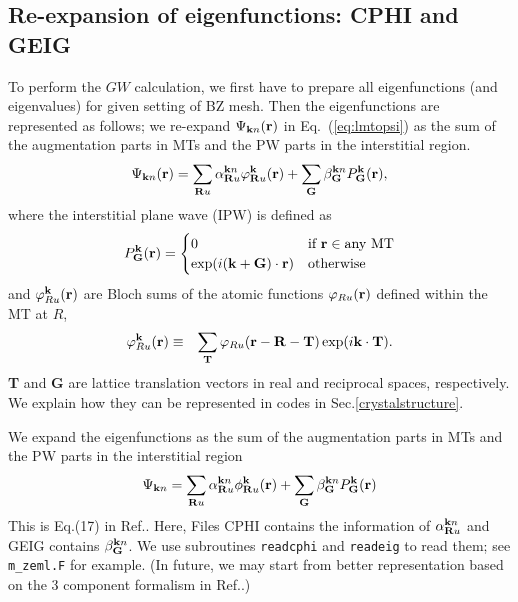 \documentclass[a4paper,10pt,epsf,fleqn]{article}
\def\Psikn{\Psi_{{\bf k}n}}
\def\Psikn{{\Psi_{{\bf k}n}}}
\newcommand{\bfk}{{\bf k}}
\newcommand{\bfr}{{\bf r}}
\newcommand{\bfR}{{\bf R}}
\newcommand{\io}[1]{{\sf  #1}}
\newcommand{\req}[1]{\mbox{Eq.~(\ref{#1})}}
\begin{document}
\subsection{Re-expansion of eigenfunctions: CPHI and GEIG}
To perform the $GW$ calculation, we first
have to prepare all eigenfunctions (and eigenvalues) for
given setting of BZ mesh. Then the eigenfunctions are
represented as follows; we
re-expand $\Psikn(\bfr)$ in \req{eq:lmtopsi}  
as the sum of the augmentation parts in MTs and the
PW parts in the interstitial region.
\begin{eqnarray}
\Psikn(\bfr)
= \sum_{\bfR u}  \alpha^{{\bfk}n}_{\bfR u} \varphi^{\bf k}_{\bfR u}({\bf r})
 + \sum_{\bf G}  \beta^{{\bfk}n}_{\bf G} P^{\bf k}_{\bf G}({\bf r}),
\label{def:psiexp}
\end{eqnarray}
where the interstitial plane wave (IPW) is defined as
\begin{eqnarray}
P^{\bf k}_{\bf G}({\bf r}) =
\begin{cases}
0    & \text{if {\bf r}} \in \text{any MT} \\
\exp(i ({\bf k+G})\cdot{\bf r})& \text{otherwise}
\end{cases}
\label{eq:defpg}
\end{eqnarray}
and $\varphi^{\bf k}_{R u}(\bfr)$ are Bloch sums of the atomic functions
$\varphi_{R u}(\bfr)$ defined within the MT at $R$,
\begin{eqnarray}
\varphi^{\bf k}_{R u}({\bf r}) &\equiv& \sum_{\bf T} \varphi_{R u}({\bf r-R-T}) \exp(i {\bf k\cdot{}T}).
\end{eqnarray}
{\bf T} and {\bf G} are lattice translation vectors in real and reciprocal spaces, respectively. 
We explain how they can be represented in codes
in Sec.\ref{crystalstructure}.


We expand the eigenfunctions as the sum of the augmentation parts in MTs and the PW parts in the interstitial region
\begin{eqnarray}
\Psi_{{\bf k}n} = \sum_{{\bf R}u}\alpha_{{\bf R}u}^{{\bf k}n}\phi_{{\bf R}u}^{\bf k}({\bf r}) + \sum_{\bf G}\beta_{\bf G}^{{\bf k}n}P_{\bf G}^{\bf k}({\bf r})
\end{eqnarray}
This is Eq.(17) in Ref.\cite{kotani_quasiparticle_2014}.
Here, Files \io{CPHI} contains the information of $\alpha_{{\bf R}u}^{{\bf k}n}$ and \io{GEIG} contains $\beta_{\bf G}^{{\bf k}n}$. 
We use subroutines \verb#readcphi# and \verb#readeig# to
read them; see \verb#m_zeml.F# for example.
(In future, we may start from better representation
based on the 3 component formalism in Ref.\cite{kotani2015pmt}.)
\end{document}
